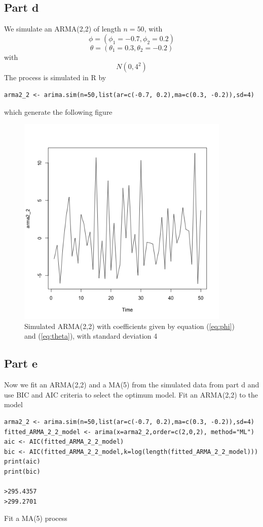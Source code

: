 \documentclass[11pt, oneside]{article}   	%
\begin{document}
\subsection{Part d}
We simulate an ARMA(2,2) of length $n=50$, with
\begin{equation}\label{eq:phi}
 \phi = (\phi_{1}=-0.7, \phi_{2}=0.2) 
 \end{equation}
 \begin{equation}\label{eq:theta}
 \theta = (\theta_{1}=0.3, \theta_{2}=-0.2)
 \end{equation}
 with 
 \begin{equation}
 N(0,4^{2}) \nonumber
 \end{equation}
 The process is simulated in R by 
 \begin{lstlisting}
arma2_2 <- arima.sim(n=50,list(ar=c(-0.7, 0.2),ma=c(0.3, -0.2)),sd=4)
\end{lstlisting}
which generate the following figure
\begin{figure}[H] %
   \centering
   \includegraphics[width=4in]{simulated-arma2_2} 
   \caption{Simulated ARMA(2,2) with coefficients given by equation (\ref{eq:phi}) and (\ref{eq:theta}), with standard deviation 4}
   \label{fig:arma22}
\end{figure}
\subsection{Part e}
Now we fit an ARMA(2,2) and a MA(5) from the simulated data from part d and use BIC and AIC criteria to select the optimum model.
\justify
Fit an ARMA(2,2) to the model
\begin{lstlisting}
arma2_2 <- arima.sim(n=50,list(ar=c(-0.7, 0.2),ma=c(0.3, -0.2)),sd=4)
fitted_ARMA_2_2_model <- arima(x=arma2_2,order=c(2,0,2), method="ML")
aic <- AIC(fitted_ARMA_2_2_model)
bic <- AIC(fitted_ARMA_2_2_model,k=log(length(fitted_ARMA_2_2_model)))
print(aic)
print(bic)

>295.4357
>299.2701
\end{lstlisting}
\justify
Fit a MA(5) process 
\end{document}
